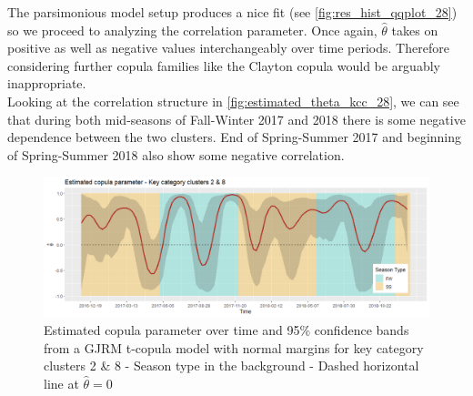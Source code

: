The parsimonious model setup produces a nice fit (see \autoref{fig:res_hist_qqplot_28}) so we proceed to analyzing the correlation parameter. Once again, $\hat{\theta}$ takes on positive as well as negative values interchangeably over time periods. Therefore considering further copula families like the Clayton copula would be arguably inappropriate.
\\

Looking at the correlation structure in \autoref{fig:estimated_theta_kcc_28}, we can see that during both mid-seasons of Fall-Winter 2017 and 2018 there is some negative dependence between the two clusters. End of Spring-Summer 2017 and beginning of Spring-Summer 2018 also show some negative correlation.


\begin{figure}[H]
\centering
  \includegraphics[width=0.95\linewidth]{figures/estimated_theta_kcc_28.png}
  \caption{Estimated copula parameter over time and 95\% confidence bands from a \ac{GJRM} t-copula model with normal margins for key category clusters 2 \& 8 - Season type in the background - Dashed horizontal line at $\hat{\theta} = 0$}
  \label{fig:estimated_theta_kcc_28}
\end{figure}














